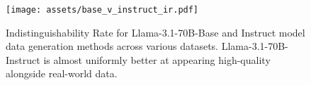 \begin{figure}[ht]
\vskip 0.2in
\begin{center}
\centerline{\texttt{[image: assets/base\_v\_instruct\_ir.pdf]}}
\caption{Indistinguishability Rate for Llama-3.1-70B-Base and Instruct model data generation methods across various datasets. Llama-3.1-70B-Instruct is almost uniformly better at appearing high-quality alongside real-world data.}
\label{ir-bar-plot}
\end{center}
\vskip -0.2in
\end{figure}

